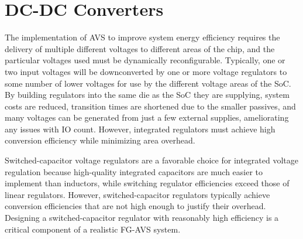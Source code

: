 \documentclass[graybox]{svmult}
\begin{document}
\section{DC-DC Converters}
\label{sec:sc-dcdc}

The implementation of AVS to improve system energy efficiency requires the delivery of multiple different voltages to different areas of the chip, and the particular voltages used must be dynamically reconfigurable.
Typically, one or two input voltages will be downconverted by one or more voltage regulators to some number of lower voltages for use by the different voltage areas of the SoC.
By building regulators into the same die as the SoC they are supplying, system costs are reduced, transition times are shortened due to the smaller passives, and many voltages can be generated from just a few external supplies, ameliorating any issues with IO count.
However, integrated regulators must achieve high conversion efficiency while minimizing area overhead.


Switched-capacitor voltage regulators are a favorable choice for integrated voltage regulation because high-quality integrated capacitors are much easier to implement than inductors, while switching regulator efficiencies exceed those of linear regulators.
However, switched-capacitor regulators typically achieve conversion efficiencies that are not high enough to justify their overhead. 
Designing a switched-capacitor regulator with reasonably high efficiency is a critical component of a realistic FG-AVS system.
\end{document}
